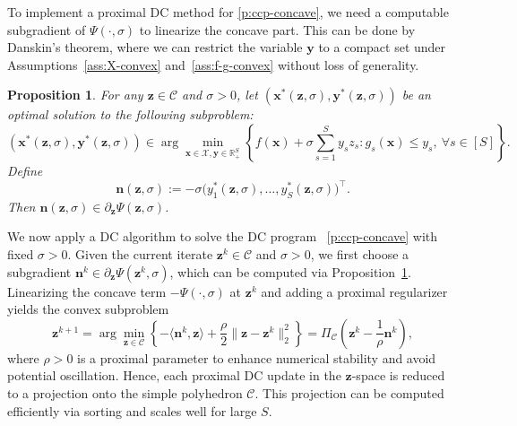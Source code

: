 \documentclass[11pt]{article}
\newtheorem{proposition}[theorem]{Proposition}
\def\bs{\boldsymbol}
\def\Re{\mathbb{R}}
\def\C{\mathcal{C}}
\def\X{\mathcal{X}}
\begin{document}
To implement a proximal DC method for \eqref{p:ccp-concave}, we need a computable subgradient of $\Psi(\cdot,\sigma)$ to linearize the concave part. This can be done by Danskin's theorem, where we can restrict the variable $\bs{y}$ to a compact set under Assumptions~\ref{ass:X-convex} and~\ref{ass:f-g-convex} without loss of generality.

\begin{proposition}{\cite[proposition B.25]{bertsekas1997nonlinear}} \label{prop:Psi-subgrad}
For any $\bs{z}\in\C$ and $\sigma>0$, let $(\bs{x}^*(\bs{z},\sigma),\bs{y}^*(\bs{z},\sigma))$ be an optimal solution to the following subproblem:
\begin{equation} \label{p:inner-min-fixed-z}
(\bs{x}^*(\bs{z},\sigma),\bs{y}^*(\bs{z},\sigma))
\in
\arg\min_{\bs{x}\in\X,\bs{y}\in\Re^S_+}
\left\{
f(\bs{x}) + \sigma \sum_{s=1}^S y_s z_s :
g_s(\bs{x})\le y_s,\ \forall s\in[S]
\right\}.
\end{equation}
Define
\begin{equation*}
\bs{n}(\bs{z},\sigma)
:=
-\sigma\bigl(y_1^*(\bs{z},\sigma),\dots,y_S^*(\bs{z},\sigma)\bigr)^\top.
\end{equation*}
Then $\bs{n}(\bs{z},\sigma)\in\partial_{\bs{z}}\Psi(\bs{z},\sigma)$.
\end{proposition}

We now apply a DC algorithm to solve the DC program ~\eqref{p:ccp-concave} with fixed $\sigma >0$. Given the current iterate $\bs{z}^k\in\C$ and $\sigma>0$, we first choose a subgradient $\bs{n }^k \in \partial_{\bs{z}}\Psi(\bs{z}^k,\sigma)$,
which can be computed via Proposition~\ref{prop:Psi-subgrad}. Linearizing the concave term $-\Psi(\cdot,\sigma)$ at $\bs{z}^k$ and adding a proximal regularizer yields the convex subproblem
\begin{equation*}
\bs{z}^{k+1}
=
\arg\min_{\bs{z}\in\C}
\left\{ -\langle \bs{n}^k,\bs{z}\rangle
+\frac{\rho}{2}\|\bs{z}-\bs{z}^k\|_2^2
\right\} = \Pi_{\C}(\bs{z}^k-\frac{1}{\rho}\bs{n}^k),
\end{equation*}
where $\rho>0$ is a proximal parameter to enhance numerical stability and avoid potential oscillation. Hence, each proximal DC update in the $\bs{z}$-space is reduced to a projection onto the simple polyhedron $\C$. This projection can be computed efficiently via sorting and scales well for large $S$.
\end{document}
